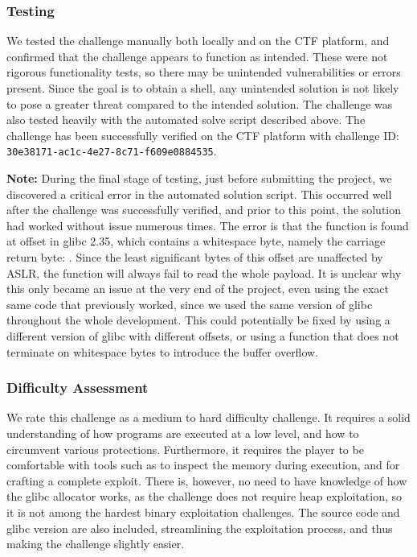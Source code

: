 \subsubsection{Testing}
We tested the challenge manually both locally and on the CTF platform, and confirmed that the challenge appears to function as intended. These were not rigorous functionality tests, so there may be unintended vulnerabilities or errors present. Since the goal is to obtain a shell, any unintended solution is not likely to pose a greater threat compared to the intended solution. The challenge was also tested heavily with the automated solve script described above.
The challenge has been successfully verified on the CTF platform with challenge ID: \texttt{30e38171-ac1c-4e27-8c71-f609e0884535}.

\textbf{Note:} During the final stage of testing, just before submitting the project, we discovered a critical error in the automated solution script. This occurred well after the challenge was successfully verified, and prior to this point, the solution had worked without issue numerous times. The error is that the  function is found at offset  in glibc 2.35, which contains a whitespace byte, namely the carriage return byte: . Since the least significant bytes of this offset are unaffected by ASLR, the  function will always fail to read the whole payload. It is unclear why this only became an issue at the very end of the project, even using the exact same code that previously worked, since we used the same version of glibc throughout the whole development. This could potentially be fixed by using a different version of glibc with different offsets, or using a function that does not terminate on whitespace bytes to introduce the buffer overflow.


\subsubsection{Difficulty Assessment}

We rate this challenge as a medium to hard difficulty challenge. It requires a solid understanding of how programs are executed at a low level, and how to circumvent various protections. Furthermore, it requires the player to be comfortable with tools such as  to inspect the memory during execution, and  for crafting a complete exploit. There is, however, no need to have knowledge of how the glibc allocator works, as the challenge does not require heap exploitation, so it is not among the hardest binary exploitation challenges\cite{malloc}. The source code and glibc version are also included, streamlining the exploitation process, and thus making the challenge slightly easier.



